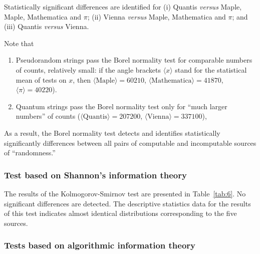 \documentclass[%
 preprint,
 showpacs,
 showkeys,
 preprintnumbers,
 amsmath,amssymb,
 aps,
 prl,
  longbibliography,
 ]{revtex4-1}
\begin{document}
Statistically significant differences are identified for
(i) Quantis {\it versus}  Maple,  Maple, Mathematica and $\pi$;
(ii) Vienna {\it versus}  Maple, Mathematica and $\pi$; and
(iii) Quantis {\it versus}  Vienna.


Note that

\begin{enumerate}

\item Pseudorandom strings pass the Borel normality test for comparable numbers of counts, relatively small:
if the angle brackets   $\langle x \rangle$ stand for the statistical mean of tests on $x$, then
 $\langle \text{Maple} \rangle  = 60210$, $\langle \text{Mathematica} \rangle  = 41870$,
$\langle  \pi \rangle  = 40220$).


\item Quantum strings pass the Borel normality test only for ``much larger numbers''
of counts
($\langle \text{Quantis} \rangle  = 207200$, $\langle \text{Vienna} \rangle  = 337100$),





\end{enumerate}

As a result, the Borel normality test detects and identifies
statistically significantly differences between all pairs of computable and incomputable  sources of ``randomness.''

 \subsubsection{Test based on Shannon's information theory}

 The results of the Kolmogorov-Smirnov test are presented in  Table~\ref{tab:6}.
No significant differences are detected. The descriptive statistics
data for the results of this test  indicates almost identical
distributions corresponding to the five sources.


\subsubsection{Tests based on algorithmic information theory}
\end{document}
